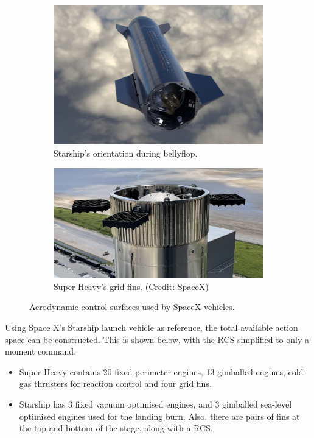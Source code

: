 \begin{figure}[H]
    \centering
    \begin{subfigure}[t]{0.48\linewidth}
        \centering
        \includegraphics[width=\linewidth]{figures/LiteratureStudy/BellyFlop.png}
        \caption{Starship's orientation during bellyflop.}
        \label{fig:bellyflop}
    \end{subfigure}
    \hfill
    \begin{subfigure}[t]{0.48\linewidth}
        \centering
        \includegraphics[width=\linewidth]{figures/LiteratureStudy/gridfin.jpg}
        \caption{Super Heavy's grid fins. (Credit: SpaceX)}
        \label{fig:gridfins}
    \end{subfigure}
    \caption{Aerodynamic control surfaces used by SpaceX vehicles.}
\end{figure}

Using Space X's Starship launch vehicle as reference, the total available action space can be constructed. This is shown below, with the RCS simplified to only a moment command.
\begin{itemize}
    \item Super Heavy contains 20 fixed perimeter engines, 13 gimballed engines, cold-gas thrusters for reaction control and four grid fins.
    \item Starship has 3 fixed vacuum optimised engines, and 3 gimballed sea-level optimised engines used for the landing burn. Also, there are pairs of fins at the top and bottom of the stage, along with a RCS.
\end{itemize}

